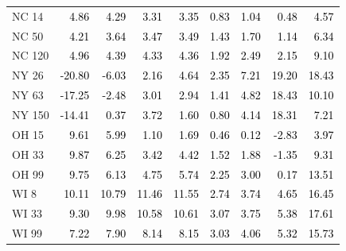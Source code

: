\documentclass{article}
\begin{document}
\begin{tabular}{lrrrrrrrr}
NC 14 & \textcolor{black}{ 4.86 } & \textcolor{black}{ 4.29 } & \textcolor{black}{ 3.31 } & \textcolor{black}{ 3.35 } & \textcolor{black}{ 0.83 } & \textcolor{black}{ 1.04 } & \textcolor{black}{ 0.48 } & \textcolor{black}{ 4.57 } \\
NC 50 & \textcolor{black}{ 4.21 } & \textcolor{black}{ 3.64 } & \textcolor{black}{ 3.47 } & \textcolor{black}{ 3.49 } & \textcolor{black}{ 1.43 } & \textcolor{black}{ 1.70 } & \textcolor{black}{ 1.14 } & \textcolor{black}{ 6.34 } \\
NC 120 & \textcolor{black}{ 4.96 } & \textcolor{black}{ 4.39 } & \textcolor{black}{ 4.33 } & \textcolor{black}{ 4.36 } & \textcolor{black}{ 1.92 } & \textcolor{black}{ 2.49 } & \textcolor{black}{ 2.15 } & \textcolor{black}{ 9.10 } \\
NY 26 & \textcolor{black}{ -20.80 } & \textcolor{black}{ -6.03 } & \textcolor{black}{ 2.16 } & \textcolor{black}{ 4.64 } & \textcolor{black}{ 2.35 } & \textcolor{black}{ 7.21 } & \textcolor{black}{ 19.20 } & \textcolor{black}{ 18.43 } \\
NY 63 & \textcolor{black}{ -17.25 } & \textcolor{black}{ -2.48 } & \textcolor{black}{ 3.01 } & \textcolor{black}{ 2.94 } & \textcolor{black}{ 1.41 } & \textcolor{black}{ 4.82 } & \textcolor{black}{ 18.43 } & \textcolor{black}{ 10.10 } \\
NY 150 & \textcolor{black}{ -14.41 } & \textcolor{black}{ 0.37 } & \textcolor{black}{ 3.72 } & \textcolor{black}{ 1.60 } & \textcolor{black}{ 0.80 } & \textcolor{black}{ 4.14 } & \textcolor{black}{ 18.31 } & \textcolor{black}{ 7.21 } \\
OH 15 & \textcolor{black}{ 9.61 } & \textcolor{black}{ 5.99 } & \textcolor{black}{ 1.10 } & \textcolor{black}{ 1.69 } & \textcolor{black}{ 0.46 } & \textcolor{black}{ 0.12 } & \textcolor{black}{ -2.83 } & \textcolor{black}{ 3.97 } \\
OH 33 & \textcolor{black}{ 9.87 } & \textcolor{black}{ 6.25 } & \textcolor{black}{ 3.42 } & \textcolor{black}{ 4.42 } & \textcolor{black}{ 1.52 } & \textcolor{black}{ 1.88 } & \textcolor{black}{ -1.35 } & \textcolor{black}{ 9.31 } \\
OH 99 & \textcolor{black}{ 9.75 } & \textcolor{black}{ 6.13 } & \textcolor{black}{ 4.75 } & \textcolor{black}{ 5.74 } & \textcolor{black}{ 2.25 } & \textcolor{black}{ 3.00 } & \textcolor{black}{ 0.17 } & \textcolor{black}{ 13.51 } \\
WI 8 & \textcolor{black}{ 10.11 } & \textcolor{black}{ 10.79 } & \textcolor{black}{ 11.46 } & \textcolor{black}{ 11.55 } & \textcolor{black}{ 2.74 } & \textcolor{black}{ 3.74 } & \textcolor{black}{ 4.65 } & \textcolor{black}{ 16.45 } \\
WI 33 & \textcolor{black}{ 9.30 } & \textcolor{black}{ 9.98 } & \textcolor{black}{ 10.58 } & \textcolor{black}{ 10.61 } & \textcolor{black}{ 3.07 } & \textcolor{black}{ 3.75 } & \textcolor{black}{ 5.38 } & \textcolor{black}{ 17.61 } \\
WI 99 & \textcolor{black}{ 7.22 } & \textcolor{black}{ 7.90 } & \textcolor{black}{ 8.14 } & \textcolor{black}{ 8.15 } & \textcolor{black}{ 3.03 } & \textcolor{black}{ 4.06 } & \textcolor{black}{ 5.32 } & \textcolor{black}{ 15.73 } \\
\bottomrule
\end{tabular}
\end{document}
